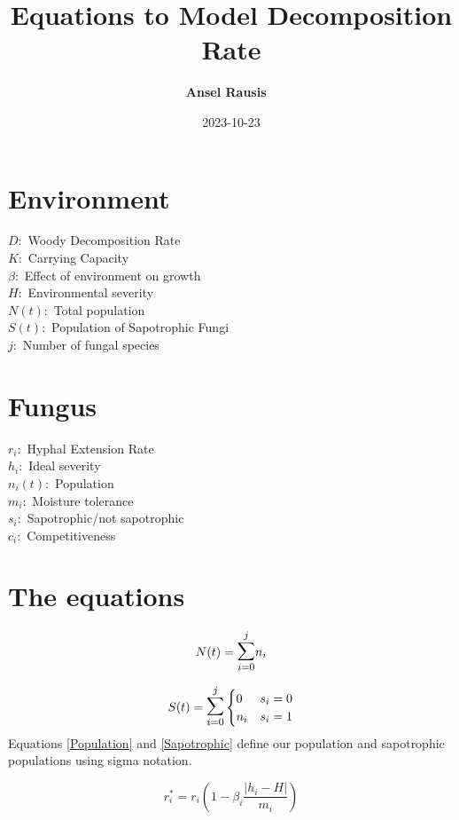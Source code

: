 \documentclass{article}
\begin{document}
\title{Equations to Model Decomposition Rate}
\author{\textbf{Ansel Rausis} \ }
\date{2023-10-23}

\noindent
\section*{Environment}
$ D: $ Woody Decomposition Rate\\
$ K: $ Carrying Capacity\\
$ \beta : $  Effect of environment on growth\\ 
$ H: $ Environmental severity\\
$ N(t): $ Total population \\
$ S(t): $ Population of Sapotrophic Fungi\\
$ j:  $ Number of fungal species

\section*{Fungus}
$ r_i: $ Hyphal Extension Rate\\
$ h_i: $ Ideal severity\\
$ n_i(t): $ Population\\
$ m_i: $ Moisture tolerance \\
$ s_i: $ Sapotrophic/not sapotrophic\\ 
$ c_i: $ Competitiveness

\section*{The equations}

\begin{equation} \label{Population}
    N(t) = \mathlarger{\mathlarger{\sum}}_{i=0}^{j} n_i
\end{equation}

\begin{equation} \label{Sapotrophic}
    S(t) = \mathlarger{\mathlarger{\sum}}_{i=0}^{j} 
    \begin{cases}
	    0 & s_i = 0\\
	    n_i & s_i = 1
    \end{cases}
\end{equation}
\noindent
Equations \ref{Population} and \ref{Sapotrophic} define our population and sapotrophic populations using sigma notation.

\begin{equation}\label{rstar}
    r^*_i  = r_i \left(1 - \beta_i\frac{|h_i - H|}{m_i}\right)
\end{equation}
\end{document}
